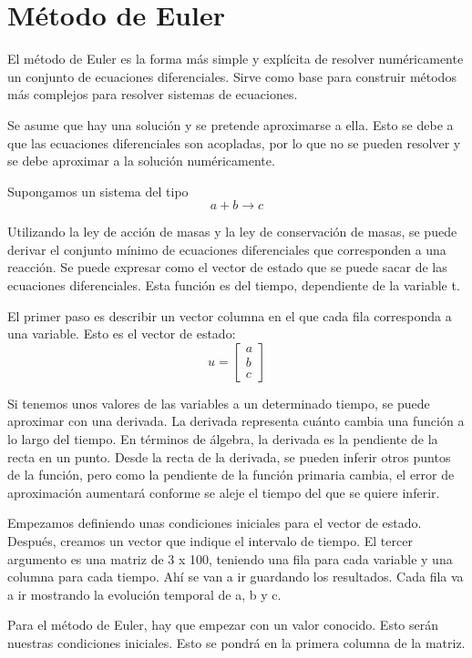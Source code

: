 \section{Método de Euler}
El método de Euler es la forma más simple y explícita de resolver numéricamente un conjunto de ecuaciones diferenciales. Sirve como base para construir métodos más complejos para resolver sistemas de ecuaciones. 

Se asume que hay una solución y se pretende aproximarse a ella. Esto se debe a que las ecuaciones diferenciales son acopladas, por lo que no se pueden resolver y se debe aproximar a la solución numéricamente. 

Supongamos un sistema del tipo
$$a + b \rightarrow c$$

Utilizando la ley de acción de masas y la ley de conservación de masas, se puede derivar el conjunto mínimo de ecuaciones diferenciales que corresponden a una reacción. Se puede expresar como el vector de estado que se puede sacar de las ecuaciones diferenciales. Esta función es del tiempo, dependiente de la variable t. 

El primer paso es describir un vector columna en el que cada fila corresponda a una variable. Esto es el vector de estado:
$$u = \begin{bmatrix}
a \\ b \\ c
\end{bmatrix}$$

Si tenemos unos valores de las variables a un determinado tiempo, se puede aproximar con una derivada. La derivada representa cuánto cambia una función a lo largo del tiempo. En términos de álgebra, la derivada es la pendiente de la recta en un punto. Desde la recta de la derivada, se pueden inferir otros puntos de la función, pero como la pendiente de la función primaria cambia, el error de aproximación aumentará conforme se aleje el tiempo del que se quiere inferir.

Empezamos definiendo unas condiciones iniciales para el vector de estado. Después, creamos un vector que indique el intervalo de tiempo. El tercer argumento es una matriz de 3 x 100, teniendo una fila para cada variable y una columna para cada tiempo. Ahí se van a ir guardando los resultados. Cada fila va a ir mostrando la evolución temporal de a, b y c. 

Para el método de Euler, hay que empezar con un valor conocido. Esto serán nuestras condiciones iniciales. Esto se pondrá en la primera columna de la matriz. 

